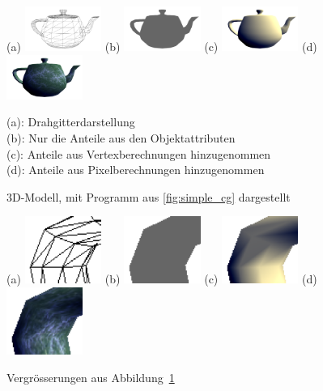 \documentclass[twoside,a4paper,fleqn,12pt]{book}
\begin{document}
\begin{figure}[h]
  \centering
  (a) \includegraphics[width=2.5cm]{mesh_wireframe_thin}\qquad
  (b) \includegraphics[width=2.5cm]{simple_s1_mesh}\qquad
  (c) \includegraphics[width=2.5cm]{simple_s1_vert}\qquad
  (d) \includegraphics[width=2.5cm]{simple_s1_frag}
  \caption{3D-Modell, mit Programm aus \ref{fig:simple_cg} dargestellt}
  \small (a): Drahgitterdarstellung\\
  (b): Nur die Anteile aus den Objektattributen\\
  (c): Anteile aus Vertexberechnungen hinzugenommen\\
  (d): Anteile aus Pixelberechnungen hinzugenommen
  \label{fig:simple_cg_images}
\end{figure}

\begin{figure}[h]
  \centering
  (a) \includegraphics[width=2.5cm]{simple_s1_crop_large_wire}\qquad
  (b) \includegraphics[width=2.5cm]{simple_s1_crop_large_mesh}\qquad
  (c) \includegraphics[width=2.5cm]{simple_s1_crop_large_vert}\qquad
  (d) \includegraphics[width=2.5cm]{simple_s1_crop_large_frag}
  \caption{Vergrösserungen aus Abbildung~\ref{fig:simple_cg_images}}
  \label{fig:simple_cg_images_large}
\end{figure}
\end{document}
